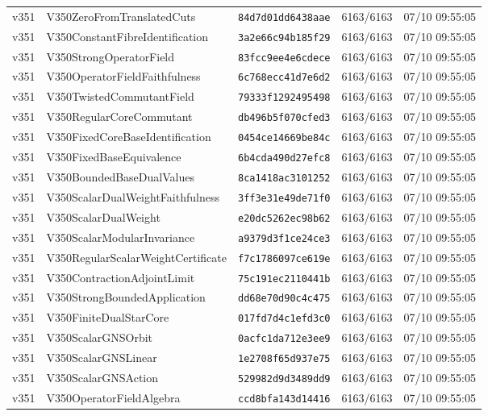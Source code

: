 \documentclass[11pt]{article}
\theoremstyle{definition}\newtheorem{deriv}{Derivação}
\begin{document}
{\begin{longtable}{@{}lllll@{}}
v351 & V350ZeroFromTranslatedCuts & \texttt{84d7d01dd6438aae} & 6163/6163 & 07/10 09:55:05 \\
v351 & V350ConstantFibreIdentification & \texttt{3a2e66c94b185f29} & 6163/6163 & 07/10 09:55:05 \\
v351 & V350StrongOperatorField & \texttt{83fcc9ee4e6cdece} & 6163/6163 & 07/10 09:55:05 \\
v351 & V350OperatorFieldFaithfulness & \texttt{6c768ecc41d7e6d2} & 6163/6163 & 07/10 09:55:05 \\
v351 & V350TwistedCommutantField & \texttt{79333f1292495498} & 6163/6163 & 07/10 09:55:05 \\
v351 & V350RegularCoreCommutant & \texttt{db496b5f070cfed3} & 6163/6163 & 07/10 09:55:05 \\
v351 & V350FixedCoreBaseIdentification & \texttt{0454ce14669be84c} & 6163/6163 & 07/10 09:55:05 \\
v351 & V350FixedBaseEquivalence & \texttt{6b4cda490d27efc8} & 6163/6163 & 07/10 09:55:05 \\
v351 & V350BoundedBaseDualValues & \texttt{8ca1418ac3101252} & 6163/6163 & 07/10 09:55:05 \\
v351 & V350ScalarDualWeightFaithfulness & \texttt{3ff3e31e49de71f0} & 6163/6163 & 07/10 09:55:05 \\
v351 & V350ScalarDualWeight & \texttt{e20dc5262ec98b62} & 6163/6163 & 07/10 09:55:05 \\
v351 & V350ScalarModularInvariance & \texttt{a9379d3f1ce24ce3} & 6163/6163 & 07/10 09:55:05 \\
v351 & V350RegularScalarWeightCertificate & \texttt{f7c1786097ce619e} & 6163/6163 & 07/10 09:55:05 \\
v351 & V350ContractionAdjointLimit & \texttt{75c191ec2110441b} & 6163/6163 & 07/10 09:55:05 \\
v351 & V350StrongBoundedApplication & \texttt{dd68e70d90c4c475} & 6163/6163 & 07/10 09:55:05 \\
v351 & V350FiniteDualStarCore & \texttt{017fd7d4c1efd3c0} & 6163/6163 & 07/10 09:55:05 \\
v351 & V350ScalarGNSOrbit & \texttt{0acfc1da712e3ee9} & 6163/6163 & 07/10 09:55:05 \\
v351 & V350ScalarGNSLinear & \texttt{1e2708f65d937e75} & 6163/6163 & 07/10 09:55:05 \\
v351 & V350ScalarGNSAction & \texttt{529982d9d3489dd9} & 6163/6163 & 07/10 09:55:05 \\
v351 & V350OperatorFieldAlgebra & \texttt{ccd8bfa143d14416} & 6163/6163 & 07/10 09:55:05 \\

\end{longtable}}
\end{document}
